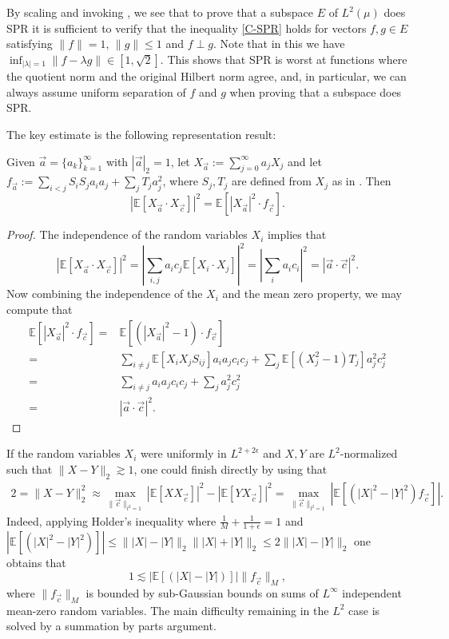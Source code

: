\documentclass{inprogress}
\begin{document}
By scaling and invoking , we see that to prove that a subspace $E$ of $L^2(\mu)$ does SPR it is sufficient to verify that        the inequality \eqref{C-SPR} holds for vectors $f,g\in E$ satisfying $\|f\|=1$, $\|g\|\leq 1$ and $f\perp g$. Note that in this we have $\inf_{|\lambda|=1}\|f-\lambda g\|\in [1,\sqrt{2}]$. This shows that SPR is worst at functions where the quotient norm and the original Hilbert norm agree, and, in particular, we can always assume uniform separation of $f$ and $g$ when proving that a subspace does SPR.





The key estimate is the following representation result:

\begin{lemma}
    Given $\vec a = \{a_k\}_{k=1}^\infty$ with $|\vec a|_2 = 1$, let $X_{\vec a}:= \sum_{j=0}^\infty a_j X_j$ and let $f_{\vec a}:=  \sum_{i<j} S_i S_j a_i a_j + \sum_{j} T_j a_j^2$, where $S_j, T_j$ are defined from $X_j$ as in . Then 
    $$
    |\mathbb E[X_{\vec a}\cdot X_{\vec c}]|^2 = \mathbb E [|X_{\vec a}|^2 \cdot f_{\vec c}].
    $$
\end{lemma}
\begin{proof}
    The independence of the random variables $X_i$ implies that 
    $$|\mathbb E[X_{\vec a}\cdot X_{\vec c}]|^2 = \left|\sum_{i,j} a_i c_j \mathbb E[X_i\cdot X_j]\right|^2  = \left|\sum_{i} a_i c_i\right|^2 =|\vec a \cdot \vec c|^2.$$
    Now combining the independence of the $X_i$ and the mean zero property, we may compute that
    $$
    \begin{aligned}
        \mathbb E [|X_{\vec a}|^2\cdot f_{\vec c}] 
        = &
        \mathbb E [(|X_{\vec a}|^2 -1)\cdot f_{\vec c}] 
        \\= &
        \sum_{i\neq j} \mathbb E[X_{i}X_j S_{ij}] a_i a_j c_i c_j+
        \sum_{j} \mathbb E[(X_j^2-1) T_j] a_j^2 c_j^2
        \\= &
        \sum_{i\neq j} a_i a_j c_i c_j+
        \sum_{j}  a_j^2 c_j^2
        \\= &
        |\vec a \cdot \vec c|^2.
    \end{aligned}
    $$
\end{proof}

If the random variables $X_i$ were uniformly in $L^{2+2\epsilon}$ and $X, Y$ are $L^2$-normalized such that $\|X-Y\|_{2}\gtrsim 1$, one could finish directly by using that 
$$
\begin{aligned}
    2 = \|X-Y\|_2^2 \approx \max_{\|\vec c\|_{l^2 = 1}} |\mathbb E[X X_{\vec c}]|^2- |\mathbb E[Y X_{\vec c}]|^2
    = 
    \max_{\|\vec c\|_{l^2 = 1}} |\mathbb E[(|X|^2-|Y|^2) f_{\vec c}]|.
\end{aligned}
$$
Indeed, applying Holder's inequality
where $\frac 1  M + \frac{1}{1+\epsilon} = 1$ and $ |\mathbb E[(|X|^2-|Y|^2) ]| \le \||X|-|Y|\|_{2} \||X|+|Y|\|_{2}\le 2  \||X|-|Y|\|_{2}$ one obtains that
$$
    1\lesssim |\mathbb E[(|X|-|Y|) ]| \|f_{\vec c}\|_M,
$$
where $\|f_{\vec c}\|_M$ is bounded by sub-Gaussian bounds on sums of $L^\infty$ independent mean-zero random variables. The main difficulty remaining in the $L^2$ case is solved by a summation by parts argument. 
\end{document}
